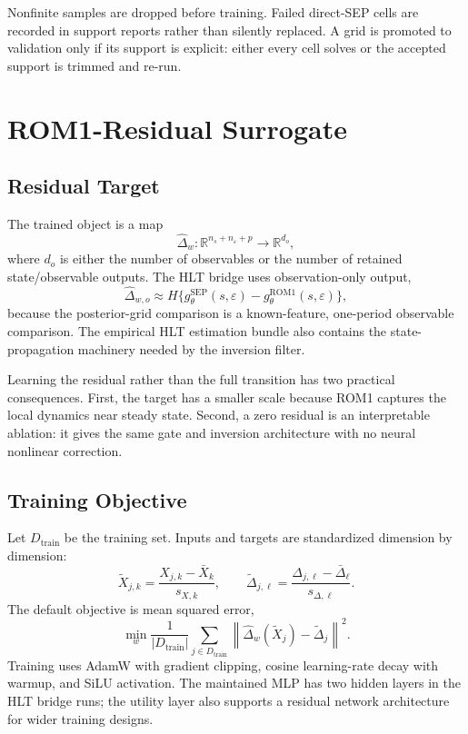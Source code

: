 \documentclass[12pt]{article}
\newcommand{\R}{\mathbb{R}}
\newcommand{\eps}{\varepsilon}
\newcommand{\norm}[1]{\left\lVert #1 \right\rVert}
\newcommand{\rom}{\mathrm{ROM1}}
\newcommand{\sep}{\mathrm{SEP}}
\begin{document}
Nonfinite samples are dropped before training. Failed direct-SEP cells are
recorded in support reports rather than silently replaced. A grid is promoted
to validation only if its support is explicit: either every cell solves or the
accepted support is trimmed and re-run.

\section{ROM1-Residual Surrogate}
\label{apptech:surrogate}

\subsection{Residual Target}

The trained object is a map
\[
  \widehat{\Delta}_w:\R^{n_s+n_\eps+p}\rightarrow\R^{d_o},
\]
where \(d_o\) is either the number of observables or the number of retained
state/observable outputs. The HLT bridge uses observation-only output,
\[
  \widehat{\Delta}_{w,o}
  \approx
  H\{g^{\sep}_\theta(s,\eps)-g^{\rom}_\theta(s,\eps)\},
\]
because the posterior-grid comparison is a known-feature, one-period
observable comparison. The empirical HLT estimation bundle also contains the
state-propagation machinery needed by the inversion filter.

Learning the residual rather than the full transition has two practical
consequences. First, the target has a smaller scale because ROM1 captures the
local dynamics near steady state. Second, a zero residual is an interpretable
ablation: it gives the same gate and inversion architecture with no neural
nonlinear correction.

\subsection{Training Objective}

Let \(D_{\mathrm{train}}\) be the training set. Inputs and targets are
standardized dimension by dimension:
\[
  \widetilde{X}_{j,k}=\frac{X_{j,k}-\bar X_k}{s_{X,k}},\qquad
  \widetilde{\Delta}_{j,\ell}=
  \frac{\Delta_{j,\ell}-\bar\Delta_\ell}{s_{\Delta,\ell}}.
\]
The default objective is mean squared error,
\begin{equation}
  \min_w
  \frac{1}{|D_{\mathrm{train}}|}
  \sum_{j\in D_{\mathrm{train}}}
  \norm{
    \widehat{\Delta}_w(\widetilde X_j)
    -
    \widetilde{\Delta}_j
  }^2.
\label{eq:tech_training_loss}
\end{equation}
Training uses AdamW with gradient clipping, cosine learning-rate decay with
warmup, and SiLU activation. The maintained MLP has two hidden layers in the HLT
bridge runs; the utility layer also supports a residual network architecture
for wider training designs.
\end{document}
